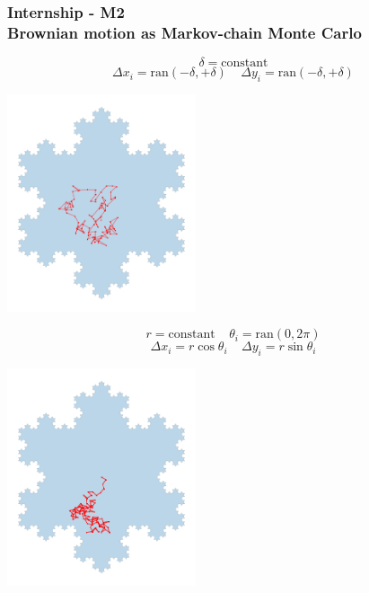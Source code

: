 \documentclass[9pt]{beamer}
\newcommand{\fives}{\ \ \ \ \ }
\newcommand{\mrm}{\mathrm}
\newcommand{\tbf}{\textbf}
\newcommand{\dlt}{\delta}
\newcommand{\Dlt}{\Delta}
\newcommand{\tta}{\theta}
\begin{document}
\begin{frame}
\frametitle{\tbf{Internship - M2} \\
\small{Brownian motion as Markov-chain Monte Carlo}}

    \begin{minipage}{0.48\linewidth}
    	$$ \dlt = \mrm{constant} $$
        $$ \Dlt x_i = \mrm{ran}(-\dlt,+\dlt) \fives \Dlt y_i = \mrm{ran}(-\dlt,+\dlt) $$
    \begin{center}
    	\includegraphics[height=6.4cm]{figs/diffuse_MCMC.png}
    \end{center}
    \end{minipage}
    \begin{minipage}{0.48\linewidth}
        $$ r = \mrm{constant} \fives \tta_i = \mrm{ran}(0,2\pi) $$
        $$ \Dlt x_i = r \cos\tta_i \fives \Dlt y_i = r \sin\tta_i $$
    \begin{center}
		\includegraphics[height=6.4cm]{figs/diffuse_req.png}
    \end{center}
    \end{minipage}


\end{frame}
\end{document}
